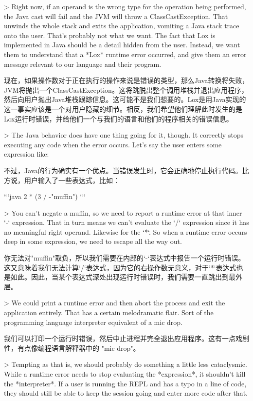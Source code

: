 \documentclass[cn,11pt,chinese]{elegantbook}
\begin{document}
{{{{> Right now, if an operand is the wrong type for the operation being performed, the Java cast will fail and the JVM will throw a ClassCastException. That unwinds the whole stack and exits the application, vomiting a Java stack trace onto the user. That’s probably not what we want. The fact that Lox is implemented in Java should be a detail hidden from the user. Instead, we want them to understand that a *Lox* runtime error occurred, and give them an error message relevant to our language and their program.

现在，如果操作数对于正在执行的操作来说是错误的类型，那么Java转换将失败，JVM将抛出一个ClassCastException。这将跳脱出整个调用堆栈并退出应用程序，然后向用户抛出Java堆栈跟踪信息。这可能不是我们想要的。Lox是用Java实现的这一事实应该是一个对用户隐藏的细节。相反，我们希望他们理解此时发生的是Lox运行时错误，并给他们一个与我们的语言和他们的程序相关的错误信息。

> The Java behavior does have one thing going for it, though. It correctly stops executing any code when the error occurs. Let’s say the user enters some expression like:

不过，Java的行为确实有一个优点。当错误发生时，它会正确地停止执行代码。比方说，用户输入了一些表达式，比如：

```java
2 * (3 / -"muffin")
```

> You can’t negate a muffin, so we need to report a runtime error at that inner `-` expression. That in turn means we can’t evaluate the `/` expression since it has no meaningful right operand. Likewise for the `*`. So when a runtime error occurs deep in some expression, we need to escape all the way out.

你无法对"muffin"取负，所以我们需要在内部的`-`表达式中报告一个运行时错误。这又意味着我们无法计算`/`表达式，因为它的右操作数无意义，对于`*`表达式也是如此。因此，当某个表达式深处出现运行时错误时，我们需要一直跳出到最外层。

> We could print a runtime error and then abort the process and exit the application entirely. That has a certain melodramatic flair. Sort of the programming language interpreter equivalent of a mic drop.

我们可以打印一个运行时错误，然后中止进程并完全退出应用程序。这有一点戏剧性，有点像编程语言解释器中的 "mic drop"。

> Tempting as that is, we should probably do something a little less cataclysmic. While a runtime error needs to stop evaluating the *expression*, it shouldn’t kill the *interpreter*. If a user is running the REPL and has a typo in a line of code, they should still be able to keep the session going and enter more code after that.

}}}}
\end{document}
